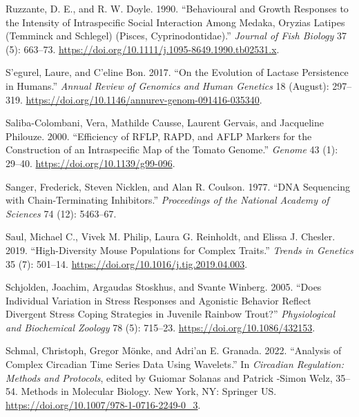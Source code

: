 \documentclass[
]{book}
\newlength{\cslhangindent}
\newlength{\cslentryspacingunit} %
\newenvironment{CSLReferences}[2] %
 {%
  \setlength{\parindent}{0pt}
  \ifodd #1
  \let\oldpar\par
  \def\par{\hangindent=\cslhangindent\oldpar}
  \fi
  \setlength{\parskip}{#2\cslentryspacingunit}
 }%
 {}
\begin{document}
\begin{CSLReferences}{1}{0}
\leavevmode{}%
Ruzzante, D. E., and R. W. Doyle. 1990. {``Behavioural and Growth Responses to the Intensity of Intraspecific Social Interaction Among Medaka, {Oryzias} Latipes ({Temminck} and {Schlegel}) ({Pisces}, {Cyprinodontidae}).''} \emph{Journal of Fish Biology} 37 (5): 663--73. \url{https://doi.org/10.1111/j.1095-8649.1990.tb02531.x}.

\leavevmode{}%
S'egurel, Laure, and C'eline Bon. 2017. {``On the {Evolution} of {Lactase Persistence} in {Humans}.''} \emph{Annual Review of Genomics and Human Genetics} 18 (August): 297--319. \url{https://doi.org/10.1146/annurev-genom-091416-035340}.

\leavevmode{}%
Saliba-Colombani, Vera, Mathilde Causse, Laurent Gervais, and Jacqueline Philouze. 2000. {``Efficiency of {RFLP}, {RAPD}, and {AFLP} Markers for the Construction of an Intraspecific Map of the Tomato Genome.''} \emph{Genome} 43 (1): 29--40. \url{https://doi.org/10.1139/g99-096}.

\leavevmode{}%
Sanger, Frederick, Steven Nicklen, and Alan R. Coulson. 1977. {``{DNA} Sequencing with Chain-Terminating Inhibitors.''} \emph{Proceedings of the National Academy of Sciences} 74 (12): 5463--67.

\leavevmode{}%
Saul, Michael C., Vivek M. Philip, Laura G. Reinholdt, and Elissa J. Chesler. 2019. {``High-{Diversity Mouse Populations} for {Complex Traits}.''} \emph{Trends in Genetics} 35 (7): 501--14. \url{https://doi.org/10.1016/j.tig.2019.04.003}.

\leavevmode{}%
Schjolden, Joachim, Argaudas Stoskhus, and Svante Winberg. 2005. {``Does {Individual Variation} in {Stress Responses} and {Agonistic Behavior Reflect Divergent Stress Coping Strategies} in {Juvenile Rainbow Trout}?''} \emph{Physiological and Biochemical Zoology} 78 (5): 715--23. \url{https://doi.org/10.1086/432153}.

\leavevmode{}%
Schmal, Christoph, Gregor Mönke, and Adri'an E. Granada. 2022. {``Analysis of {Complex Circadian Time Series Data Using Wavelets}.''} In \emph{Circadian {Regulation}: {Methods} and {Protocols}}, edited by Guiomar Solanas and Patrick -Simon Welz, 35--54. Methods in {Molecular Biology}. {New York, NY}: {Springer US}. \url{https://doi.org/10.1007/978-1-0716-2249-0_3}.


\end{CSLReferences}
\end{document}
